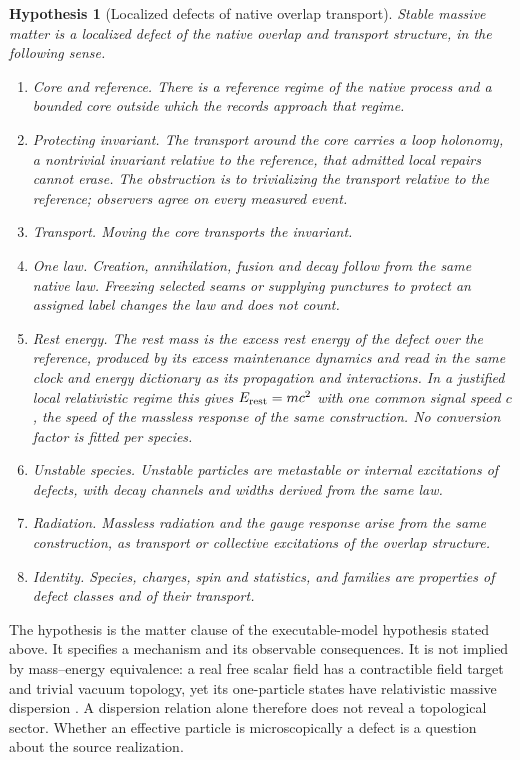 \documentclass[11pt]{article}
\newtheorem{hypothesis}[theorem]{Hypothesis}
\begin{document}
\begin{hypothesis}[Localized defects of native overlap transport]
\label{hyp:defect}
Stable massive matter is a localized defect of the native overlap and
transport structure, in the following sense.
\begin{enumerate}[leftmargin=2em,label=(\roman*)]
\item \emph{Core and reference.} There is a reference regime of the
native process and a bounded core outside which the records approach that
regime.
\item \emph{Protecting invariant.} The transport around the core carries a
loop holonomy, a nontrivial invariant relative to the reference, that
admitted local repairs cannot erase. The obstruction is to trivializing the
transport relative to the reference; observers agree on every measured
event.
\item \emph{Transport.} Moving the core transports the invariant.
\item \emph{One law.} Creation, annihilation, fusion and decay follow from
the same native law. Freezing selected seams or supplying punctures to
protect an assigned label changes the law and does not count.
\item \emph{Rest energy.} The rest mass is the excess rest energy of the
defect over the reference, produced by its excess maintenance dynamics and
read in the same clock and energy dictionary as its propagation and
interactions. In a justified local relativistic regime this gives
\(E_{\rm rest}=mc^2\) with one common signal speed \(c\), the speed of the
massless response of the same construction. No conversion factor is fitted
per species.
\item \emph{Unstable species.} Unstable particles are metastable or
internal excitations of defects, with decay channels and widths derived
from the same law.
\item \emph{Radiation.} Massless radiation and the gauge response arise from
the same construction, as transport or collective excitations of the
overlap structure.
\item \emph{Identity.} Species, charges, spin and statistics, and families
are properties of defect classes and of their transport.
\end{enumerate}
\end{hypothesis}

The hypothesis is the matter clause of the executable-model hypothesis
stated above. It specifies a mechanism and its observable consequences. It
is not implied by mass--energy equivalence: a real free scalar field has a
contractible field target and trivial vacuum topology, yet its one-particle
states have relativistic massive dispersion \cite{tongQFT}. A dispersion
relation alone therefore does not reveal a topological sector. Whether an
effective particle is microscopically a defect is a question about the
source realization.
\end{document}
